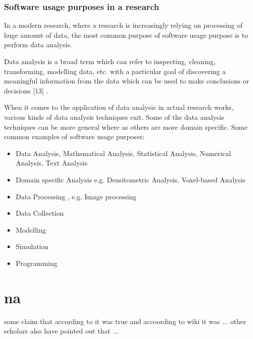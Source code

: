 \documentclass[12pt, a4paper]{article}
\begin{document}
\subsubsection{Software usage purposes in a research}
In a modern research, where a research is increasingly relying on processing of huge amount of data, the most common purpose of software usage purpose is to perform data analysis. 

Data analysis is a broad term which can refer to inspecting, cleaning, transforming, modelling data, etc. with a particular goal of discovering a meaningful information from the data which can be used to make conclusions or decisions [13] . 

When it comes to the application of data analysis in actual research works, various kinds of data analysis techniques exit. Some of the data analysis techniques can be more general where as others are more domain specific. Some common examples of software usage purposes:
\vspace{-1mm}   %
	\begin{itemize}[noitemsep,topsep=5pt, leftmargin=0.5in] %
		\item Data Analysis, Mathematical Analysis, Statistical Analysis, Numerical Analysis, Text Analysis
		\item Domain specific Analysis e.g. Densitometric Analysis, Voxel-based Analysis
		\item Data Processing , e.g. Image processing
		\item Data Collection
		\item Modelling
		\item Simulation
		\item Programming
		
	\end{itemize}

\clearpage

\section{na}

some claim \cite{goble2014better} that according to \cite{hannay2009scientists} it was true and accoording to wiki \cite{enwiki:1056292826} it  was ... other scholars also have pointed out that ... \cite{wilson2014best}

\clearpage

 
\end{document}
